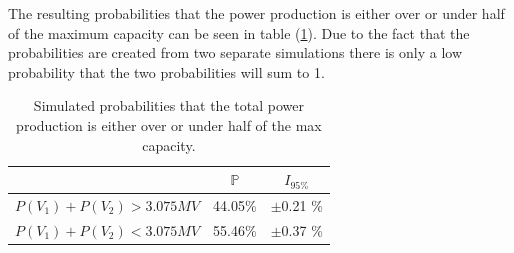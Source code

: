 \documentclass[a4paper]{article}
\begin{document}
The resulting probabilities that the power production is either over or under half of the maximum capacity can be seen in table (\ref{table:probabilities}). Due to the fact that the probabilities are created from two separate simulations there is only a low probability that the two probabilities will sum to 1. 

\begin{table}[H]
    \centering
    \caption{Simulated probabilities that the total power production is either over or under half of the max capacity.}
    \begin{tabular}{lcc}
        \toprule
        & $\mathbb{P}$ & $I_{95\%}$ \\
        \midrule
        $P(V_1) + P(V_2) > 3.075MV$ & 44.05\% & $\pm$0.21 \% \\
        $P(V_1) + P(V_2) < 3.075MV$ & 55.46\% & $\pm$0.37 \% \\
        \bottomrule
    \end{tabular}
    \label{table:probabilities}
\end{table}
    
\end{document}
